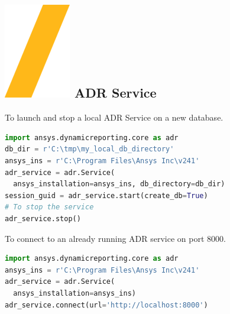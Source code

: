 \documentclass[9pt,landscape]{article}
\begin{document}
\begin{multicols}{3}
\setlength{\premulticols}{1pt}
\setlength{\postmulticols}{1pt}
\setlength{\multicolsep}{1pt}
\setlength{\columnsep}{2pt}

\section{\includegraphics[height=\fontcharht\font`\S]{slash.png} ADR Service}
To launch and stop a local ADR Service on a new database.
\begin{lstlisting}[language=Python]
import ansys.dynamicreporting.core as adr
db_dir = r'C:\tmp\my_local_db_directory'
ansys_ins = r'C:\Program Files\Ansys Inc\v241'
adr_service = adr.Service(
  ansys_installation=ansys_ins, db_directory=db_dir)
session_guid = adr_service.start(create_db=True)
# To stop the service
adr_service.stop()
\end{lstlisting}

To connect to an already running ADR service on port 8000.

\begin{lstlisting}[language=Python]
import ansys.dynamicreporting.core as adr
ansys_ins = r'C:\Program Files\Ansys Inc\v241'
adr_service = adr.Service(
  ansys_installation=ansys_ins)
adr_service.connect(url='http://localhost:8000') 
\end{lstlisting}


\end{multicols}
\end{document}
